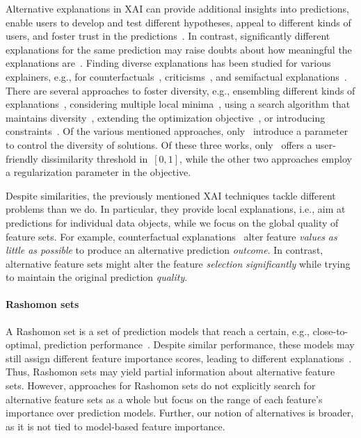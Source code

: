 Alternative explanations in XAI can provide additional insights into predictions, enable users to develop and test different hypotheses, appeal to different kinds of users, and foster trust in the predictions~\cite{kim2021multi, wang2019designing}.
In contrast, significantly different explanations for the same prediction may raise doubts about how meaningful the explanations are~\cite{jain2019attention}.
Finding diverse explanations has been studied for various explainers, e.g., for counterfactuals~\cite{dandl2020multi, karimi2020model, mohammadi2021scaling, mothilal2020explaining, russell2019efficient, wachter2017counterfactual}, criticisms~\cite{kim2016examples}, and semifactual explanations~\cite{artelt2022even}.
There are several approaches to foster diversity, e.g., ensembling different kinds of explanations~\cite{silva2019produce}, considering multiple local minima~\cite{wachter2017counterfactual}, using a search algorithm that maintains diversity~\cite{dandl2020multi}, extending the optimization objective~\cite{artelt2022even, kim2016examples, mothilal2020explaining}, or introducing constraints~\cite{karimi2020model, mohammadi2021scaling, russell2019efficient}.
Of the various mentioned approaches, only~\cite{artelt2022even, mohammadi2021scaling, mothilal2020explaining} introduce a parameter to control the diversity of solutions.
Of these three works, only~\cite{mohammadi2021scaling} offers a user-friendly dissimilarity threshold in~$[0,1]$, while the other two approaches employ a regularization parameter in the objective.

Despite similarities, the previously mentioned XAI techniques tackle different problems than we do.
In particular, they provide local explanations, i.e., aim at predictions for individual data objects, while we focus on the global quality of feature sets.
For example, counterfactual explanations~\cite{guidotti2022counterfactual, stepin2021survey, verma2020counterfactual} alter feature \emph{values} \emph{as little as possible} to produce an alternative prediction \emph{outcome}.
In contrast, alternative feature sets might alter the feature \emph{selection} \emph{significantly} while trying to maintain the original prediction \emph{quality}.

\paragraph{Rashomon sets}

A Rashomon set is a set of prediction models that reach a certain, e.g., close-to-optimal, prediction performance~\cite{fisher2019all}.
Despite similar performance, these models may still assign different feature importance scores, leading to different explanations~\cite{laberge2023partial}.
Thus, Rashomon sets may yield partial information about alternative feature sets.
However, approaches for Rashomon sets do not explicitly search for alternative feature sets as a whole but focus on the range of each feature's importance over prediction models.
Further, our notion of alternatives is broader, as it is not tied to model-based feature importance.

